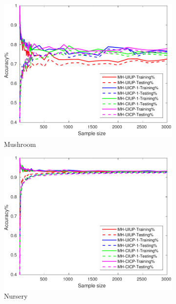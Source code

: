 \begin{figure}[ht]
\begin{subfigure}[b]{0.3\textwidth}
  	\includegraphics[width=\textwidth]{figs/PLPTF/Trees/MushroomDownsampled_Trees_MH.pdf}
  	\caption{Mushroom}
		\label{fig:Mush2}
	\end{subfigure}
  \begin{subfigure}[b]{0.3\textwidth}
		\centering
  	\includegraphics[width=\textwidth]{figs/PLPTF/Trees/NurseryDownsampledFurther_Trees_MH.pdf}
  	\caption{Nursery}
		\label{fig:N2}
	\end{subfigure}
  \begin{subfigure}[b]{0.3\textwidth}
		\centering

\end{subfigure}
\end{figure}
